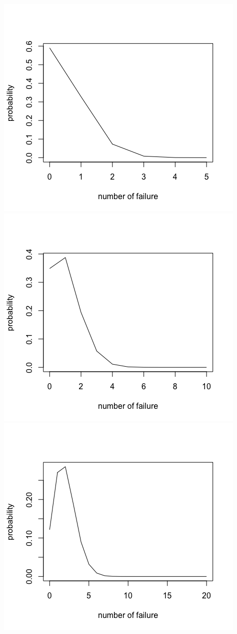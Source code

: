 \documentclass[11pt, oneside]{article}
\begin{document}
\begin{enumerate}
\begin{enumerate}
        \includegraphics[scale=0.3]{121}
        \includegraphics[scale=0.3]{122}
        \includegraphics[scale=0.3]{123}
        

\end{enumerate}
\end{enumerate}
\end{document}
